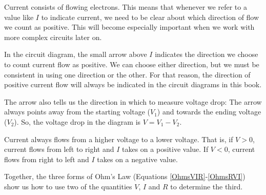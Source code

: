 \begin{kaobox}[frametitle=Signs of things to come \dots]
Current consists of flowing electrons.
This means that whenever we refer to a value like $I$ to indicate current, we need to be clear about which direction of flow we count as positive.
This will become especially important when we work with more complex circuits later on.

In the circuit diagram, the small arrow above $I$ indicates the direction we choose to count current flow as positive.
We can choose either direction, but we must be consistent in using one direction or the other. 
For that reason, the direction of positive current flow will always be indicated in the circuit diagrams in this book.


The arrow also tells us the direction in which to measure voltage drop: 
The arrow always points away from the starting voltage ($V_1$) and towards the ending voltage ($V_2$).
So, the voltage drop in the diagram is $V=V_1-V_2$.

Current always flows from a higher voltage to a lower voltage.
That is, if $V>0$, current flows from left to right and $I$ takes on a positive value.
If $V<0$, current flows from right to left and $I$ takes on a negative value.
\end{kaobox}


Together, the three forms of Ohm's Law (Equations \ref{OhmsVIR}-\ref{OhmsRVI}) show us how to use two of the quantities $V$, $I$ and $R$ to determine the third.

